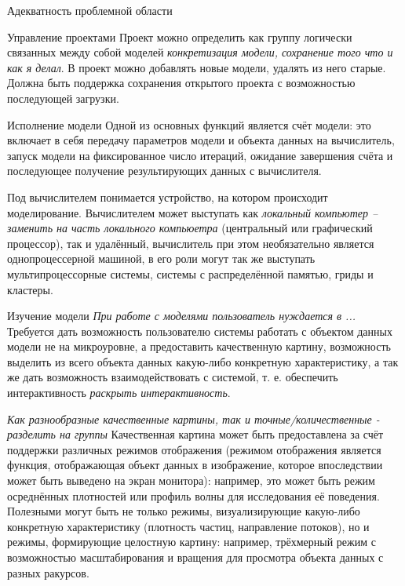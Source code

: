 \documentclass[a4paper,12pt]{extarticle}
\begin{document}
\begin{subsection}{Адекватность проблемной области}
\begin{subsubsection}{Управление проектами}
        Проект можно определить как группу логически связанных между собой моделей \textit{конкретизация модели, сохранение того что и как я делал}. В проект можно добавлять новые модели, удалять из него старые. Должна быть поддержка сохранения открытого проекта с возможностью последующей загрузки.
    \end{subsubsection}
        
    \begin{subsubsection}{Исполнение модели} 
        Одной из основных функций является счёт модели: это включает в себя передачу параметров модели и объекта данных на вычислитель, запуск модели на фиксированное число итераций, ожидание завершения счёта и последующее получение результирующих данных с вычислителя.
        
        Под вычислителем понимается устройство, на котором происходит моделирование. Вычислителем может выступать как \textit{локальный компьютер -- заменить на часть локального компьюетра} (центральный или графический процессор), так и удалённый, вычислитель при этом необязательно является однопроцессерной машиной, в его роли могут так же выступать мультипроцессорные системы, системы с распределённой памятью, гриды и кластеры.
    \end{subsubsection}
        
    \begin{subsubsection}{Изучение модели}
        \textit{При работе с моделями пользователь нуждается в ...} Требуется дать возможность пользователю системы работать с объектом данных модели не на микроуровне, а предоставить качественную картину, возможность выделить из всего объекта данных какую-либо конкретную характеристику, а так же дать возможность взаимодействовать с системой, т. е. обеспечить интерактивность \textit{раскрыть интерактивность}.
        
        \textit{Как разнообразные качественные картины, так и точные/количественные - разделить на группы} Качественная картина может быть предоставлена за счёт поддержки различных режимов отображения (режимом отображения является функция, отображающая объект данных в изображение, которое впоследствии может быть выведено на экран монитора): например, это может быть режим осреднённых плотностей или профиль волны для исследования её поведения. Полезными могут быть не только режимы, визуализирующие какую-либо конкретную характеристику (плотность частиц, направление потоков), но и режимы, формирующие целостную картину: например, трёхмерный режим с возможностью масштабирования и вращения для просмотра объекта данных с разных ракурсов.
    \end{subsubsection}
        

\end{subsection}
\end{document}
